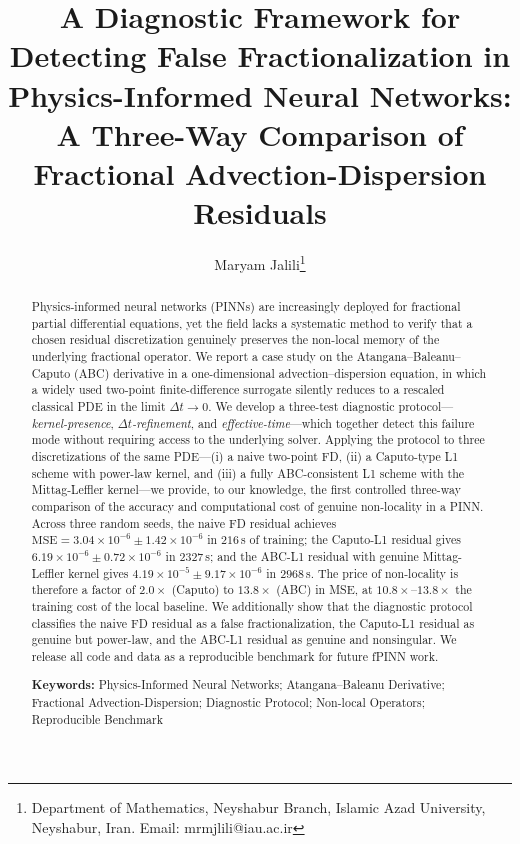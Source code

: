 \documentclass[11pt]{article}
\title{\textbf{A Diagnostic Framework for Detecting False Fractionalization in Physics-Informed Neural Networks: \\ A Three-Way Comparison of Fractional Advection-Dispersion Residuals}}
\author{Maryam Jalili\thanks{Department of Mathematics, Neyshabur Branch, Islamic Azad University, Neyshabur, Iran. Email: mrmjlili@iau.ac.ir}}
\date{}
\begin{document}
\maketitle

\begin{abstract}
\noindent
Physics-informed neural networks (PINNs) are increasingly deployed for fractional partial differential equations, yet the field lacks a systematic method to verify that a chosen residual discretization genuinely preserves the non-local memory of the underlying fractional operator. We report a case study on the Atangana--Baleanu--Caputo (ABC) derivative in a one-dimensional advection--dispersion equation, in which a widely used two-point finite-difference surrogate silently reduces to a rescaled classical PDE in the limit \(\Delta t \to 0\). We develop a three-test diagnostic protocol---\emph{kernel-presence}, \emph{\(\Delta t\)-refinement}, and \emph{effective-time}---which together detect this failure mode without requiring access to the underlying solver. Applying the protocol to three discretizations of the same PDE---(i) a naive two-point FD, (ii) a Caputo-type L1 scheme with power-law kernel, and (iii) a fully ABC-consistent L1 scheme with the Mittag-Leffler kernel---we provide, to our knowledge, the first controlled three-way comparison of the accuracy and computational cost of genuine non-locality in a PINN. Across three random seeds, the naive FD residual achieves \(\mathrm{MSE} = 3.04 \times 10^{-6} \pm 1.42 \times 10^{-6}\) in \(216\)\,s of training; the Caputo-L1 residual gives \(6.19 \times 10^{-6} \pm 0.72 \times 10^{-6}\) in \(2327\)\,s; and the ABC-L1 residual with genuine Mittag-Leffler kernel gives \(4.19 \times 10^{-5} \pm 9.17 \times 10^{-6}\) in \(2968\)\,s. The price of non-locality is therefore a factor of \(2.0\times\) (Caputo) to \(13.8\times\) (ABC) in MSE, at \(10.8\times\)--\(13.8\times\) the training cost of the local baseline. We additionally show that the diagnostic protocol classifies the naive FD residual as a false fractionalization, the Caputo-L1 residual as genuine but power-law, and the ABC-L1 residual as genuine and nonsingular. We release all code and data as a reproducible benchmark for future fPINN work.

\vspace{0.5cm}
\noindent\textbf{Keywords:} Physics-Informed Neural Networks; Atangana--Baleanu Derivative; Fractional Advection-Dispersion; Diagnostic Protocol; Non-local Operators; Reproducible Benchmark
\end{abstract}
\end{document}
